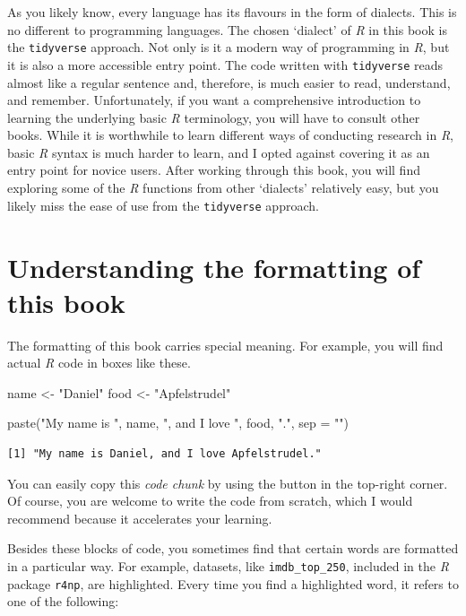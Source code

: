 \documentclass[
  letterpaper,
]{krantz}
\makeatletter
\newenvironment{Shaded}{\begin{snugshade}}{\end{snugshade}}
\newcommand{\AttributeTok}[1]{\textcolor[rgb]{0.40,0.45,0.13}{#1}}
\newcommand{\FunctionTok}[1]{\textcolor[rgb]{0.28,0.35,0.67}{#1}}
\newcommand{\NormalTok}[1]{\textcolor[rgb]{0.00,0.23,0.31}{#1}}
\newcommand{\OtherTok}[1]{\textcolor[rgb]{0.00,0.23,0.31}{#1}}
\newcommand{\StringTok}[1]{\textcolor[rgb]{0.13,0.47,0.30}{#1}}
\newenvironment{kframe}{%
\medskip{}
\setlength{\fboxsep}{.8em}
 \def\at@end@of@kframe{}%
 \ifinner\ifhmode%
  \def\at@end@of@kframe{\end{minipage}}%
  \begin{minipage}{\columnwidth}%
 \fi\fi%
 \def\FrameCommand##1{\hskip\@totalleftmargin \hskip-\fboxsep
 \colorbox{shadecolor}{##1}\hskip-\fboxsep
     \hskip-\linewidth \hskip-\@totalleftmargin \hskip\columnwidth}%
 \MakeFramed {\advance\hsize-\width
   \@totalleftmargin\z@ \linewidth\hsize
   \@setminipage}}%
 {\par\unskip\endMakeFramed%
 \at@end@of@kframe}
\renewenvironment{Shaded}{\begin{kframe}}{\end{kframe}}
\makeatother
\begin{document}
As you likely know, every language has its flavours in the form of
dialects. This is no different to programming languages. The chosen
`dialect' of \emph{R} in this book is the \texttt{tidyverse} approach.
Not only is it a modern way of programming in \emph{R}, but it is also a
more accessible entry point. The code written with \texttt{tidyverse}
reads almost like a regular sentence and, therefore, is much easier to
read, understand, and remember. Unfortunately, if you want a
comprehensive introduction to learning the underlying basic \emph{R}
terminology, you will have to consult other books. While it is
worthwhile to learn different ways of conducting research in \emph{R},
basic \emph{R} syntax is much harder to learn, and I opted against
covering it as an entry point for novice users. After working through
this book, you will find exploring some of the \emph{R} functions from
other `dialects' relatively easy, but you likely miss the ease of use
from the \texttt{tidyverse} approach.

\section{Understanding the formatting of this
book}\label{formatting-of-this-book}

The formatting of this book carries special meaning. For example, you
will find actual \emph{R} code in boxes like these.

\begin{Shaded}
\begin{Highlighting}[]
\NormalTok{name }\OtherTok{\textless{}{-}} \StringTok{"Daniel"}
\NormalTok{food }\OtherTok{\textless{}{-}} \StringTok{"Apfelstrudel"}

\FunctionTok{paste}\NormalTok{(}\StringTok{"My name is "}\NormalTok{, name, }\StringTok{", and I love "}\NormalTok{, food, }\StringTok{"."}\NormalTok{, }\AttributeTok{sep =} \StringTok{""}\NormalTok{)}
\end{Highlighting}
\end{Shaded}

\begin{verbatim}
[1] "My name is Daniel, and I love Apfelstrudel."
\end{verbatim}

You can easily copy this \emph{code chunk} by using the button in the
top-right corner. Of course, you are welcome to write the code from
scratch, which I would recommend because it accelerates your learning.

Besides these blocks of code, you sometimes find that certain words are
formatted in a particular way. For example, datasets, like
\texttt{imdb\_top\_250}, included in the \emph{R} package \texttt{r4np},
are highlighted. Every time you find a highlighted word, it refers to
one of the following:
\end{document}
